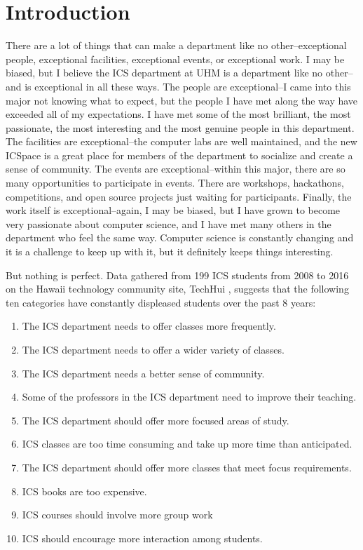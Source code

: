\chapter{Introduction}
There are a lot of things that can make a department like no other--exceptional people, exceptional facilities, exceptional events, or exceptional work. I may be biased, but I believe the ICS department at UHM is a department like no other--and is exceptional in all these ways. The people are exceptional--I came into this major not knowing what to expect, but the people I have met along the way have exceeded all of my expectations. I have met some of the most brilliant, the most passionate, the most interesting and the most genuine people in this department. The facilities are exceptional--the computer labs are well maintained, and the new ICSpace is a great place for members of the department to socialize and create a sense of community. The events are exceptional--within this major, there are so many opportunities to participate in events. There are workshops, hackathons, competitions, and open source projects just waiting for participants. Finally, the work itself is exceptional--again, I may be biased, but I have grown to become very passionate about computer science, and I have met many others in the department who feel the same way. Computer science is constantly changing and it is a challenge to keep up with it, but it definitely keeps things interesting.

But nothing is perfect. Data gathered from 199 ICS students from 2008 to 2016 on the Hawaii technology community site, TechHui \cite {TechHuiQuestions}, suggests that the following ten categories have constantly displeased students over the past 8 years:

\begin{enumerate}
  \item The ICS department needs to offer classes more frequently.
  \item The ICS department needs to offer a wider variety of classes.
  \item The ICS department needs a better sense of community.
  \item Some of the professors in the ICS department need to improve their teaching.
  \item The ICS department should offer more focused areas of study.
  \item ICS classes are too time consuming and take up more time than anticipated.
  \item The ICS department should offer more classes that meet focus requirements.
  \item ICS books are too expensive.
  \item ICS courses should involve more group work 
  \item ICS should encourage more interaction among students.
\end{enumerate}

